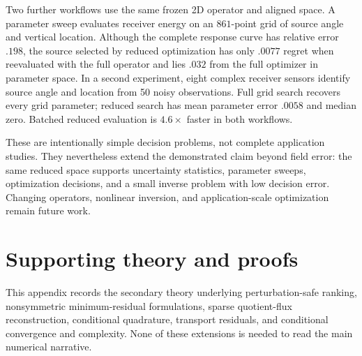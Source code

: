 \documentclass[11pt]{article}
\numberwithin{algorithm}{section}
\theoremstyle{definition}\newtheorem{definition}[theorem]{Definition}
\theoremstyle{remark}\newtheorem{remark}[theorem]{Remark}
\begin{document}
Two further workflows use the same frozen 2D operator and aligned space. A
parameter sweep evaluates receiver energy on an $861$-point grid of source
angle and vertical location. Although the complete response curve has relative
error $.198$, the source selected by reduced optimization has only $.0077$
regret when reevaluated with the full operator and lies $.032$ from the full
optimizer in parameter space. In a second experiment, eight complex receiver
sensors identify source angle and location from 50 noisy observations. Full
grid search recovers every grid parameter; reduced search has mean parameter
error $.0058$ and median zero. Batched reduced evaluation is $4.6\times$
faster in both workflows.

These are intentionally simple decision problems, not complete application
studies. They nevertheless extend the demonstrated claim beyond field error:
the same reduced space supports uncertainty statistics, parameter sweeps,
optimization decisions, and a small inverse problem with low decision error.
Changing operators, nonlinear inversion, and application-scale optimization
remain future work.

\section{Supporting theory and proofs}
\label{app:supporting-theory}
This appendix records the secondary theory underlying perturbation-safe
ranking, nonsymmetric minimum-residual formulations, sparse quotient-flux
reconstruction, conditional quadrature, transport residuals, and conditional
convergence and complexity.  None of these extensions is needed to read the
main numerical narrative.


\fi
\end{document}
